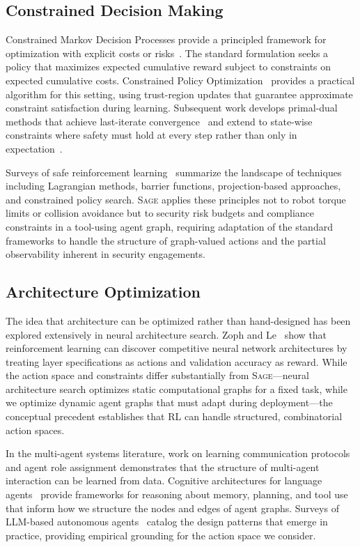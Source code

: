 \documentclass[sigconf,anonymous]{acmart}
\newcommand{\SAGE}{\textsc{Sage}\xspace}
\begin{document}
\subsection{Constrained Decision Making}

Constrained Markov Decision Processes provide a principled framework for optimization with explicit costs or risks~\cite{altman1999cmdp}. The standard formulation seeks a policy that maximizes expected cumulative reward subject to constraints on expected cumulative costs. Constrained Policy Optimization~\cite{achiam2017cpo} provides a practical algorithm for this setting, using trust-region updates that guarantee approximate constraint satisfaction during learning. Subsequent work develops primal-dual methods that achieve last-iterate convergence~\cite{ding2024lastiterateconvergence} and extend to state-wise constraints where safety must hold at every step rather than only in expectation~\cite{zhao2023saferlsurvey}.

Surveys of safe reinforcement learning~\cite{kushwaha2024saferl,zhao2023saferlsurvey} summarize the landscape of techniques including Lagrangian methods, barrier functions, projection-based approaches, and constrained policy search. \SAGE applies these principles not to robot torque limits or collision avoidance but to security risk budgets and compliance constraints in a tool-using agent graph, requiring adaptation of the standard frameworks to handle the structure of graph-valued actions and the partial observability inherent in security engagements.

\subsection{Architecture Optimization}

The idea that architecture can be optimized rather than hand-designed has been explored extensively in neural architecture search. Zoph and Le~\cite{zoph2017nas} show that reinforcement learning can discover competitive neural network architectures by treating layer specifications as actions and validation accuracy as reward. While the action space and constraints differ substantially from \SAGE---neural architecture search optimizes static computational graphs for a fixed task, while we optimize dynamic agent graphs that must adapt during deployment---the conceptual precedent establishes that RL can handle structured, combinatorial action spaces.

In the multi-agent systems literature, work on learning communication protocols~\cite{lowe2017marl} and agent role assignment demonstrates that the structure of multi-agent interaction can be learned from data. Cognitive architectures for language agents~\cite{sumers2024cognitive} provide frameworks for reasoning about memory, planning, and tool use that inform how we structure the nodes and edges of agent graphs. Surveys of LLM-based autonomous agents~\cite{wang2024survey,xi2023rise} catalog the design patterns that emerge in practice, providing empirical grounding for the action space we consider.
\end{document}
